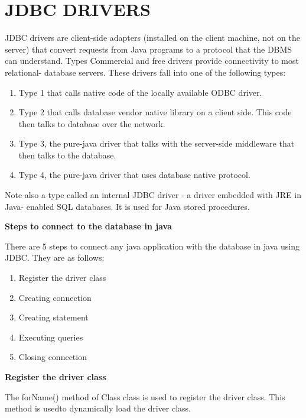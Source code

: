 \section{JDBC DRIVERS}
JDBC drivers are client-side adapters (installed on the client machine, not on the
server) that convert requests from Java programs to a protocol that the DBMS can
understand. Types Commercial and free drivers provide connectivity to most relational-
database servers. These drivers fall into one of the following types:
\renewcommand{\theenumi}{\alph{enumi}}
\begin{enumerate}
\item Type 1 that calls native code of the locally available ODBC driver.
\item Type 2 that calls database vendor native library on a client side. This code then talks to database over the network.
\item Type 3, the pure-java driver that talks with the server-side middleware that then talks to the database.
\item Type 4, the pure-java driver that uses database native protocol.
\end{enumerate}
Note also a type called an internal JDBC driver - a driver embedded with JRE in Java-
enabled SQL databases. It is used for Java stored procedures. \\[0.4in]
\begin{large}
\textbf{Steps to connect to the database in java} \\[0.2in]
\end{large}
There are 5 steps to connect any java application with the database in java using
JDBC. They are as follows:
\renewcommand{\theenumi}{\arabic{enumi}}
\begin{enumerate}
\item Register the driver class
\item Creating connection
\item Creating statement
\item Executing queries
\item Closing connection \\[0.2in]
\end{enumerate}
\begin{large}
\textbf{Register the driver class} \\[0.2in]
\end{large}
The forName() method of Class class is used to register the driver class. This method is usedto dynamically load the driver class. \\
